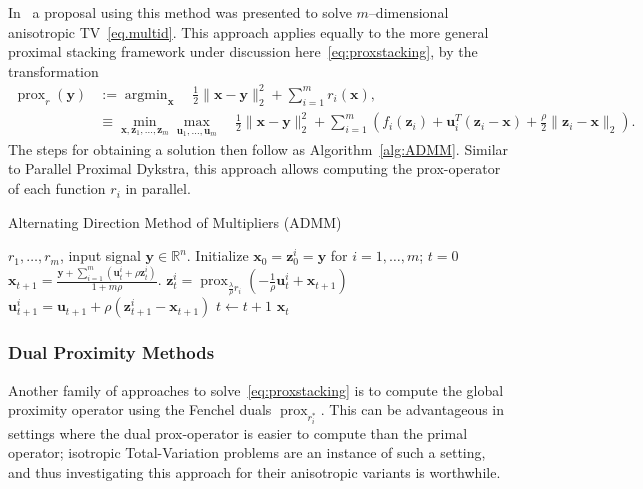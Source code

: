 \documentclass[twoside,11pt]{article}
\newcommand{\vu}{\bm{u}}       \newcommand{\vuh}{\hat{\bm{u}}}        \newcommand{\uh}{\hat{u}}    \newcommand{\vut}{\tilde{\bm{u}}}       \newcommand{\ut}{\tilde{u}}
\newcommand{\vx}{\bm{x}}       \newcommand{\vxh}{\hat{\bm{x}}}        \newcommand{\xh}{\hat{x}}    \newcommand{\vxt}{\tilde{\bm{x}}}       \newcommand{\xt}{\tilde{x}}
\newcommand{\vy}{\bm{y}}       \newcommand{\vyh}{\hat{\bm{y}}}        \newcommand{\yh}{\hat{y}}    \newcommand{\vyt}{\tilde{\bm{y}}}       \newcommand{\yt}{\tilde{y}}
\newcommand{\vz}{\bm{z}}       \newcommand{\vzh}{\hat{\bm{z}}}        \newcommand{\zh}{\hat{z}}    \newcommand{\vzt}{\tilde{\bm{z}}}       \newcommand{\zt}{\tilde{z}}
\newcommand{\mynorm}[2]{\| {#1} \|_{#2}}
\newcommand{\enorm}[1]{\mynorm{#1}{2}}
\DeclareMathOperator*{\argmin}{argmin}
\DeclareMathOperator{\prox}{prox}
\newcommand{\nlsum}{\sum\nolimits}
\newcommand{\reals}{\mathbb{R}}
\newcommand{\half}{\tfrac{1}{2}}
\numberwithin{equation}{section}
\numberwithin{theorem}{section}
\begin{document}
In~\citep{YangTV} a proposal using this method was presented to solve $m$--dimensional anisotropic TV~\eqref{eq.multid}. This approach applies equally to the more general proximal stacking framework under discussion here~\eqref{eq:proxstacking}, by the transformation
\begin{align*}
 \prox_r(\vy) &:= \argmin_{\vx}\quad \half\enorm{\vx - \vy}^2 + \nlsum_{i=1}^m r_i(\vx), \\
 &\equiv \min_{\vx, \vz_1, \ldots, \vz_m} \max_{\vu_1, \ldots, \vu_m} \quad \half\enorm{\vx - \vy}^2 +  \sum_{i=1}^m \left( f_i(\vz_i) + \vu_i^T (\vz_i - \vx) + \frac{\rho}{2} \enorm{\vz_i - \vx} \right).
\end{align*}
The steps for obtaining a solution then follow as Algorithm~\ref{alg:ADMM}. Similar to Parallel Proximal Dykstra, this approach allows computing the prox-operator of each function $r_i$ in parallel.

\begin{algorithm}[t]
  \caption{\small Alternating Direction Method of Multipliers (ADMM)}
  \label{alg:ADMM}
  \begin{algorithmic}
     $r_1, \ldots, r_m$, input signal $\vy \in \reals^n$.
    \State Initialize $\vx_0 = \vz^i_0 = \vy$ for $i = 1, \ldots, m$; $t=0$
    \State $\vx_{t+1} = \frac{\vy + \sum_{i=1}^m (\vu^i_t + \rho \vz^i_t)}{1 + m\rho}$.
    \State $\vz^i_t = \prox_{\frac{\lambda}{\rho} r_i} (-\frac{1}{\rho} \vu^i_t + \vx_{t+1})$
    \State $\vu^i_{t+1} = \vu_{t+1} + \rho(\vz^i_{t+1} - \vx_{t+1})$
    \EndFor
    \State $t \gets t + 1$
    \EndWhile
     $\vx_t$
  \end{algorithmic}
\end{algorithm}

\subsubsection{Dual Proximity Methods}
\label{sec:dualproxmethods}
Another family of approaches to solve~\eqref{eq:proxstacking} is to compute the global proximity operator using the Fenchel duals $\prox_{r^*_i}$. This can be advantageous in settings where the dual prox-operator is easier to compute than the primal operator; isotropic Total-Variation problems are an instance of such a setting, and thus investigating this approach for their anisotropic variants is worthwhile.
\end{document}
